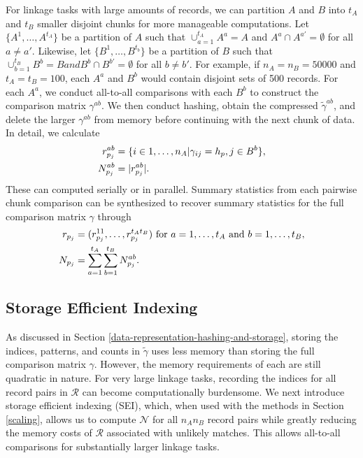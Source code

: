 \documentclass[ba]{imsart}
\begin{document}
		For linkage tasks with large amounts of records, we can partition $A$ and $B$ into $t_A$ and $t_B$ smaller disjoint chunks for more manageable computations. Let $\{A^1, \dots, A^{t_A}\}$ be a partition of $A$ such that $\cup_{a=1}^{t_A} A^a = A$ and $A^a \cap A^{a'}=\emptyset$ for all $a \neq a'$.  Likewise, let $\{B^1, \dots, B^{t_b}\}$ be a partition of $B$ such that $\cup_{b=1}^{t_B} B^b = B and B^b \cap B^{b'}=\emptyset$ for all $b \neq b'$.  For example, if $n_A = n_B = 50000$ and $t_A = t_B = 100$, each $A^a$ and $B^b$ would contain disjoint sets of 500 records. For each $A^a$, we conduct all-to-all comparisons with each $B^b$ to construct the comparison matrix $\gamma^{ab}$. We then conduct hashing, obtain the compressed $\tilde{\gamma}^{ab}$, and delete the larger $\gamma^{ab}$ from memory before continuing with the next chunk of data. In detail, we calculate
\begin{subequations}
	\begin{align}
		r_{p_j}^{ab} &= \{i \in 1, \dots, n_A| \gamma_{ij} = h_p, j \in B^b\}, \label{r_{p_j}^{ab}} \\
		N_{p_j}^{ab} &= |r_{p_j}^{ab}|. \label{N_{p_j}^{ab}}
	\end{align}
\end{subequations}
These can computed serially or in parallel. Summary statistics from each pairwise chunk comparison can be synthesized to recover summary statistics for the full comparison matrix $\gamma$ through
\begin{subequations}
	\begin{align}
		r_{p_j} &= (r_{p_j}^{11}, \ldots, r_{p_j}^{ t_A t_B}) \text{ for } a = 1, \ldots, t_A \text{ and } b = 1, \ldots, t_B, \label{r_{p_j}} \\
		N_{p_j} &= \sum_{a = 1}^{t_A} \sum_{b = 1}^{t_B} N_{p_j}^{ab}.\label{N_{p_j}}	\end{align}
\end{subequations} 

\hypertarget{SEI}{%
	\subsection{Storage Efficient Indexing}\label{SEI}}

As discussed in Section \ref{data-representation-hashing-and-storage}, storing the indices, patterns, and counts in $\tilde{\gamma}$ uses less memory than storing the full comparison matrix $\gamma$. However, the memory requirements of each are still quadratic in nature. For very large linkage tasks, recording the indices for all record pairs in $\mathcal{R}$ can become computationally burdensome. We next introduce storage efficient indexing (SEI), which, when used with the methods in Section \ref{scaling}, allows us to compute $\mathcal{N}$ for all $n_A n_B$ record pairs while greatly reducing the memory costs of $\mathcal{R}$ associated with unlikely matches. This allows all-to-all comparisons for substantially larger linkage tasks.
\end{document}
